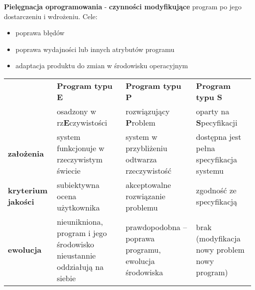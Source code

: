 \documentclass[a4paper]{article}
\begin{document}
    \textbf{Pielęgnacja oprogramowania} - \textbf{czynności modyfikujące} program
    po jego dostarczeniu i wdrożeniu. Cele:
    \begin{itemize}
        \item poprawa błędów
        \item poprawa wydajności lub innych atrybutów programu
        \item adaptacja produktu do zmian w środowisku operacyjnym
    \end{itemize}


    \begin{table}[H]
        \begin{center}
            \begin{tabular}{ p{2cm} | p{4cm} | p{4cm} | p{4cm}}
                & \textbf{Program typu E}            & \textbf{Program typu P}       & \textbf{Program typu S}         \\
                & osadzony w rz\textbf{E}czywistości & rozwiązujący \textbf{P}roblem & oparty na \textbf{S}pecyfikacji \\
                \toprule
                \textbf{założenia} & system funkcjonuje w rzeczywistym świecie
                & system w przybliżeniu odtwarza rzeczywistość
                & dostępna jest pełna specyfikacja systemu
                \\

                \cmidrule(r){2-2}\cmidrule(rl){3-3}\cmidrule(l){4-4}

                \textbf{kryterium jakości} & subiektywna ocena użytkownika
                & akceptowalne rozwiązanie problemu
                & zgodność ze specyfikacją
                \\

                \cmidrule(r){2-2}\cmidrule(rl){3-3}\cmidrule(l){4-4}
                \textbf{ewolucja} & nieunikniona, program i jego środowisko nieustannie oddziałują na siebie
                &
                prawdopodobna – poprawa programu, ewolucja środowiska
                &
                brak (modyfikacja nowy problem nowy program)
                \\
            \end{tabular}
        \end{center}
    \end{table}
\end{document}
